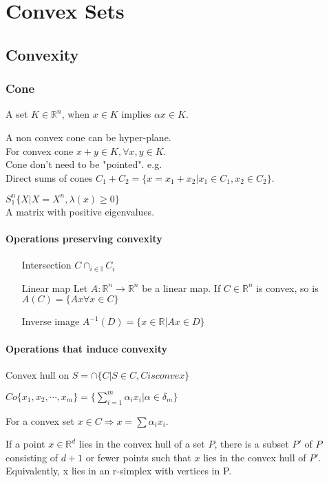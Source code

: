 \documentclass[11pt]{book} %
\def\R{\mathbb{R}}
\begin{document}
\chapter{Convex Sets}
\section{Convexity}
\subsection{Cone}
\begin{definition}[Cone]
A set $K \in \R^n$, when $x \in K $ implies $\alpha x \in K$.
\end{definition}
A non convex cone can be hyper-plane.\\
For convex cone $x + y \in K, \forall x,y \in K$.\\
Cone don't need to be "pointed". e.g. \cite{article_key} \\
Direct sums of cones $C_1 + C_2 = \{ x = x_1+x_2 | x_1 \in C_1, x_2 \in C_2 \}$.\\
\begin{example}
$S_1^n  \{ X | X=X^n ,\lambda(x) \ge 0\}$\\
A matrix with positive eigenvalues.
\end{example}

\subsubsection{Operations preserving convexity}
\begin{itemize}
\item[Intersection] $C  \cap_{i \in \mathbb{I}}C_i$
\item[Linear map] Let $A : \mathbb{R}^n \to  \R^n$ be a linear map. If $C \in \R^n$ is convex, so is $A(C) = \{Ax \forall x \in C \}$
\item[Inverse image] $A^{-1}(D) = \{ x \in \R |Ax \in D \}$
\end{itemize}

\subsubsection{Operations that induce convexity}
Convex hull on $S = \cap \{C | S\in C, C is convex\}$\\
\begin{example}
$Co \{ x_1,x_2,\cdots,x_m\} = \{ \sum_{i=1}^m \alpha_i x_i | \alpha \in \delta_m \}$
\end{example}
For a convex set $x \in C \Rightarrow x = \sum \alpha_i x_i$. 
\begin{theorem}
If a point $x \in \R^d$ lies in the convex hull of a set $P$, there is a subset $P'$ of $P$ consisting of $d + 1$ or fewer points such that $x$ lies in the convex hull of $P'$. Equivalently, x lies in an r-simplex with vertices in P.
\end{theorem}
\end{document}
